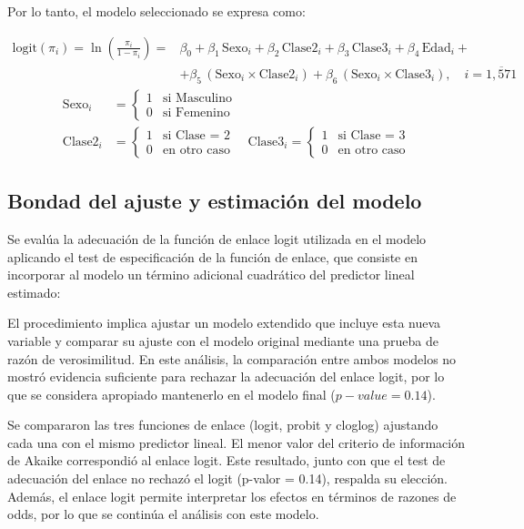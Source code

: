 \documentclass[
  spanish,
  11pt,
  letterpaper,
  DIV=11,
  numbers=noendperiod]{scrartcl}
\begin{document}
Por lo tanto, el modelo seleccionado se expresa como:

\[
\begin{aligned}
\text{logit}(\pi_i) =  \ln\left(\frac{\pi_i}{1 - \pi_i}\right) = &
\beta_0 + \beta_1\,\text{Sexo}_i +
\beta_2\,\text{Clase2}_i +
\beta_3\, \text{Clase3}_i+
\beta_4\, \text{Edad}_i+ \\
& + \beta_5\,(\text{Sexo}_i \times \text{Clase2}_i) + 
\beta_6\, (\text{Sexo}_i \times \text{Clase3}_i), \quad i=\overline{1,571}
\end{aligned}
\] \[
\begin{aligned}
\text{Sexo}_i &= \begin{cases} 1 & \text{si Masculino} \\ 0 & \text{si Femenino} \end{cases} \\[4pt]
\text{Clase2}_i &= \begin{cases} 1 & \text{si Clase = 2} \\ 0 & \text{en otro caso} \end{cases}
\quad
\text{Clase3}_i = \begin{cases} 1 & \text{si Clase = 3} \\ 0 & \text{en otro caso} \end{cases}
\end{aligned}
\]

\subsection{Bondad del ajuste y estimación del
modelo}\label{bondad-del-ajuste-y-estimaciuxf3n-del-modelo}

Se evalúa la adecuación de la función de enlace logit utilizada en el
modelo aplicando el test de especificación de la función de enlace, que
consiste en incorporar al modelo un término adicional cuadrático del
predictor lineal estimado:

El procedimiento implica ajustar un modelo extendido que incluye esta
nueva variable y comparar su ajuste con el modelo original mediante una
prueba de razón de verosimilitud. En este análisis, la comparación entre
ambos modelos no mostró evidencia suficiente para rechazar la adecuación
del enlace logit, por lo que se considera apropiado mantenerlo en el
modelo final (\(p-value = 0.14\)).

Se compararon las tres funciones de enlace (logit, probit y cloglog)
ajustando cada una con el mismo predictor lineal. El menor valor del
criterio de información de Akaike correspondió al enlace logit. Este
resultado, junto con que el test de adecuación del enlace no rechazó el
logit (p-valor = 0.14), respalda su elección. Además, el enlace logit
permite interpretar los efectos en términos de razones de odds, por lo
que se continúa el análisis con este modelo.
\end{document}
